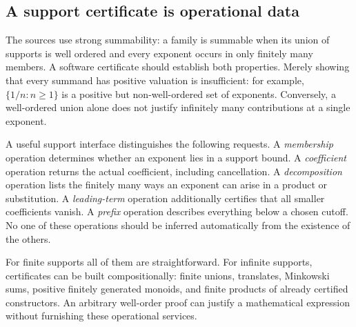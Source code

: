 \documentclass[11pt,letterpaper]{article}
\numberwithin{equation}{section}
\theoremstyle{definition}
\theoremstyle{remark}\newtheorem{remark}[theorem]{Remark}
\begin{document}
\subsection{A support certificate is operational data}
The sources use strong summability: a family is summable when its union of
supports is well ordered and every exponent occurs in only finitely many
members. A software certificate should establish both properties. Merely
showing that every summand has positive valuation is insufficient: for
example, $\{1/n:n\ge1\}$ is a positive but non-well-ordered set of exponents.
Conversely, a well-ordered union alone does not justify infinitely many
contributions at a single exponent.

A useful support interface distinguishes the following requests. A
\emph{membership} operation determines whether an exponent lies in a support
bound. A \emph{coefficient} operation returns the actual coefficient, including
cancellation. A \emph{decomposition} operation lists the finitely many ways
an exponent can arise in a product or substitution. A \emph{leading-term}
operation additionally certifies that all smaller coefficients vanish. A
\emph{prefix} operation describes everything below a chosen cutoff. No one
of these operations should be inferred automatically from the existence of
the others.

For finite supports all of them are straightforward. For infinite supports,
certificates can be built compositionally: finite unions, translates,
Minkowski sums, positive finitely generated monoids, and finite products of
already certified constructors. An arbitrary well-order proof can justify
a mathematical expression without furnishing these operational services.
\end{document}
